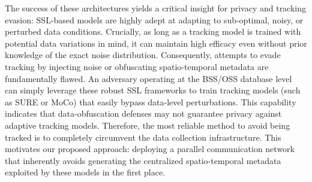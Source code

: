 The success of these architectures yields a critical insight for privacy and tracking evasion: SSL-based models are highly adept at adapting to sub-optimal, 
noisy, or perturbed data conditions. Crucially, as long as a tracking model is trained with potential data variations in mind, it can maintain high efficacy even without prior knowledge 
of the exact noise distribution. Consequently, attempts to evade tracking by injecting noise or obfuscating spatio-temporal metadata are fundamentally flawed. 
An adversary operating at the BSS/OSS database level  can simply leverage these robust SSL frameworks to train tracking models (such as SURE or MoCo) that easily bypass data-level perturbations.
This capability indicates that data-obfuscation defenses may not guarantee privacy against adaptive tracking models. Therefore, the most reliable method to avoid being tracked is
to completely circumvent the data collection infrastructure. This motivates our proposed approach: deploying a parallel communication network that inherently avoids generating the centralized spatio-temporal 
metadata exploited by these models in the first place.

